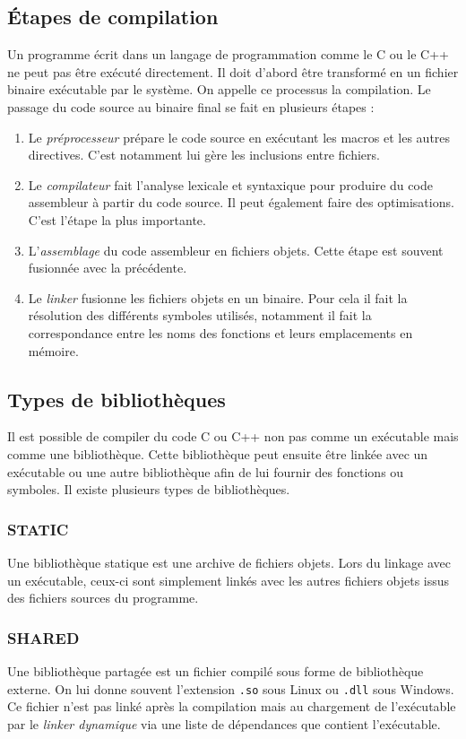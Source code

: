 \documentclass[a4paper,11pt]{report}
\begin{document}
\subsection{Étapes de compilation}
Un programme écrit dans un langage de programmation comme le C ou le C++ ne peut pas être exécuté directement.
Il doit d'abord être transformé en un fichier binaire exécutable par le système.
On appelle ce processus la compilation.
Le passage du code source au binaire final se fait en plusieurs étapes :
\begin{enumerate}
    \item Le \emph{préprocesseur} prépare le code source en exécutant les macros et les autres directives.
          C'est notamment lui gère les inclusions entre fichiers.
    \item Le \emph{compilateur} fait l'analyse lexicale et syntaxique pour produire du code assembleur à partir du code source.
          Il peut également faire des optimisations.
          C'est l'étape la plus importante.
    \item L'\emph{assemblage} du code assembleur en fichiers objets.
          Cette étape est souvent fusionnée avec la précédente.
    \item Le \emph{linker} fusionne les fichiers objets en un binaire.
          Pour cela il fait la résolution des différents symboles utilisés, notamment il fait la correspondance entre les noms des fonctions et leurs emplacements en mémoire.
\end{enumerate}

\subsection{Types de bibliothèques}
Il est possible de compiler du code C ou C++ non pas comme un exécutable mais comme une bibliothèque.
Cette bibliothèque peut ensuite être linkée avec un exécutable ou une autre bibliothèque afin de lui fournir des fonctions ou symboles.
Il existe plusieurs types de bibliothèques.

\subsubsection{STATIC}
Une bibliothèque statique est une archive de fichiers objets.
Lors du linkage avec un exécutable, ceux-ci sont simplement linkés avec les autres fichiers objets issus des fichiers sources du programme.

\subsubsection{SHARED}
Une bibliothèque partagée est un fichier compilé sous forme de bibliothèque externe.
On lui donne souvent l'extension \verb'.so' sous Linux ou \verb'.dll' sous Windows.
Ce fichier n'est pas linké après la compilation mais au chargement de l'exécutable par le \emph{linker dynamique} via une liste de dépendances que contient l'exécutable.
\end{document}
